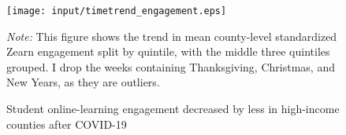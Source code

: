 


\begin{figure}[hbt!]
  \caption{Student online-learning engagement decreased by less in high-income counties after COVID-19}
    \centering
    \texttt{[image: input/timetrend\_engagement.eps]}
    \begin{minipage}{\textwidth}
        \footnotesize
        \textit{Note:} This figure shows the trend in mean county-level standardized Zearn engagement
        split by quintile, with the middle three quintiles grouped.
        I drop the weeks containing Thanksgiving, Christmas, and New Years,
        as they are outliers.
    \end{minipage}
\end{figure}
\fi
